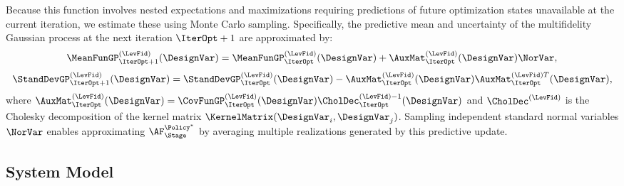 Because this function involves nested expectations and maximizations requiring predictions of future optimization states unavailable at the current iteration, we estimate these using Monte Carlo sampling. Specifically, the predictive mean and uncertainty of the multifidelity Gaussian process at the next iteration \(\IterOpt+1\) are approximated by:
\begin{equation} \label{e:MCmu}
\MeanFunGP^{(\LevFid)}_{\IterOpt+1}(\DesignVar) = \MeanFunGP^{(\LevFid)}_{\IterOpt}(\DesignVar) + \AuxMat^{(\LevFid)}_{\IterOpt}(\DesignVar) \NorVar,
\end{equation}
\begin{equation} \label{e:MCsigma}
\StandDevGP^{(\LevFid)}_{\IterOpt+1}(\DesignVar) = \StandDevGP^{(\LevFid)}_{\IterOpt}(\DesignVar) - \AuxMat^{(\LevFid)}_{\IterOpt}(\DesignVar) \AuxMat^{(\LevFid)T}_{\IterOpt}(\DesignVar),
\end{equation}
where \(\AuxMat^{(\LevFid)}_{\IterOpt}(\DesignVar) = \CovFunGP^{(\LevFid)}_{\IterOpt}(\DesignVar) \CholDec^{(\LevFid)-1}_{\IterOpt}(\DesignVar)\) and \(\CholDec^{(\LevFid)}\) is the Cholesky decomposition of the kernel matrix \(\KernelMatrix(\DesignVar_i, \DesignVar_j)\). Sampling independent standard normal variables \(\NorVar\) enables approximating \(\AF^{\Policy^*}_{\Stage}\) by averaging multiple realizations generated by this predictive update.


\subsection{System Model}

